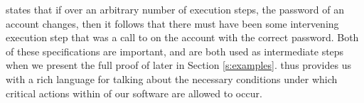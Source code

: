  states that if over an arbitrary number of execution steps, the password of an account changes,
then it follows that there must have been some intervening execution step that was a call to  on the account 
with the correct password. Both of these specifications are important, and are both used as intermediate steps
when we present the full proof of  later in Section \ref{s:examples}.
\Nec thus provides us with a rich language for talking about the necessary conditions
under which critical actions within of our software are allowed to occur. 
 
 
